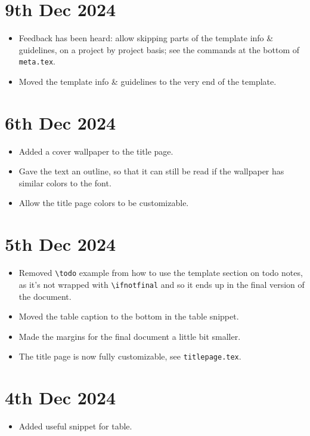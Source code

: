 
\section*{9th Dec 2024} \label{sec:changelog:2024/12/09}
\begin{itemize}
    \item Feedback has been heard: allow skipping parts of the template info \& guidelines, on a project by project basis; see the commands at the bottom of \verb|meta.tex|.
    \item Moved the template info \& guidelines to the very end of the template.
\end{itemize}

\section*{6th Dec 2024} \label{sec:changelog:2024/12/06}
\begin{itemize}
    \item Added a cover wallpaper to the title page.
    \item Gave the text an outline, so that it can still be read if the wallpaper has similar colors to the font.
    \item Allow the title page colors to be customizable.
\end{itemize}

\section*{5th Dec 2024} \label{sec:changelog:2024/12/05}
\begin{itemize}
    \item Removed \verb|\todo| example from how to use the template section on todo notes, as it's not wrapped with \verb|\ifnotfinal| and so it ends up in the final version of the document.
    \item Moved the table caption to the bottom in the table snippet.
    \item Made the margins for the final document a little bit smaller.
    \item The title page is now fully customizable, see \verb|titlepage.tex|.
\end{itemize}

\section*{4th Dec 2024} \label{sec:changelog:2024/12/04}
\begin{itemize}
    \item Added useful snippet for table.
\end{itemize}

